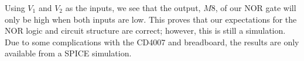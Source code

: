 \FloatBarrier

Using $V_1$ and $V_2$ as the inputs, we see that the output, $M8$, of our NOR gate will only be high when both inputs are low. This proves that our expectations for the NOR logic and circuit structure are correct; however, this is still a simulation. Due to some complications with the CD4007 and breadboard, the results are only available from a SPICE simulation.
